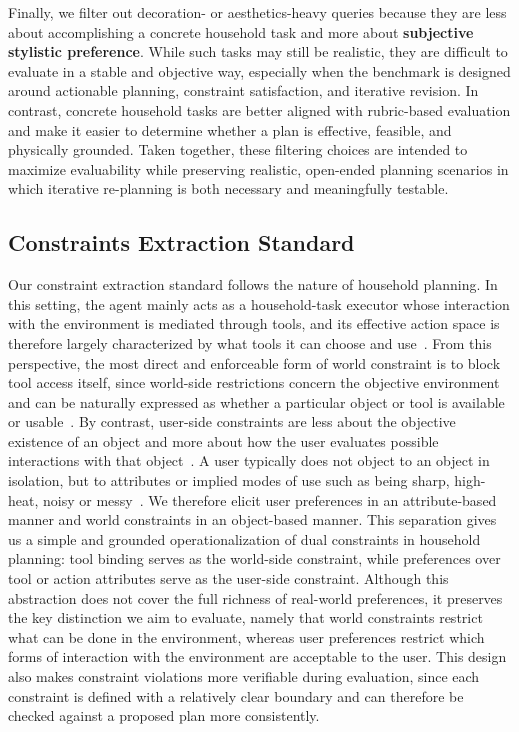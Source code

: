 Finally, we filter out decoration- or aesthetics-heavy queries because they are less about accomplishing a concrete household task and more about \textbf{subjective stylistic preference}. 
While such tasks may still be realistic, they are difficult to evaluate in a stable and objective way, especially when the benchmark is designed around actionable planning, constraint satisfaction, and iterative revision. 
In contrast, concrete household tasks are better aligned with rubric-based evaluation and make it easier to determine whether a plan is effective, feasible, and physically grounded. 
Taken together, these filtering choices are intended to maximize evaluability while preserving realistic, open-ended planning scenarios in which iterative re-planning is both necessary and meaningfully testable.

\subsection{Constraints Extraction Standard}
\label{app:user-attribute-discussion}

Our constraint extraction standard follows the nature of household planning. 
In this setting, the agent mainly acts as a household-task executor whose interaction with the environment is mediated through tools, and its effective action space is therefore largely characterized by what tools it can choose and use~\citep{shridhar2020alfredbenchmarkinterpretinggrounded,VirtualHome}.
From this perspective, the most direct and enforceable form of world constraint is to block tool access itself, since world-side restrictions concern the objective environment and can be naturally expressed as whether a particular object or tool is available or usable~\citep{Birr_2024,ahn2022icanisay}. 
By contrast, user-side constraints are less about the objective existence of an object and more about how the user evaluates possible interactions with that object~\citep{narcomey2024learninghumanpreferencesrobot,Gerevini2005PlanCA,guo2025mathematical}. 
A user typically does not object to an object in isolation, but to attributes or implied modes of use such as being sharp, high-heat, noisy or messy~\citep{10.1145/3472208,Story2022}. 
We therefore elicit user preferences in an attribute-based manner and world constraints in an object-based manner. 
This separation gives us a simple and grounded operationalization of dual constraints in household planning: tool binding serves as the world-side constraint, while preferences over tool or action attributes serve as the user-side constraint. 
Although this abstraction does not cover the full richness of real-world preferences, it preserves the key distinction we aim to evaluate, namely that world constraints restrict what can be done in the environment, whereas user preferences restrict which forms of interaction with the environment are acceptable to the user. 
This design also makes constraint violations more verifiable during evaluation, since each constraint is defined with a relatively clear boundary and can therefore be checked against a proposed plan more consistently.

